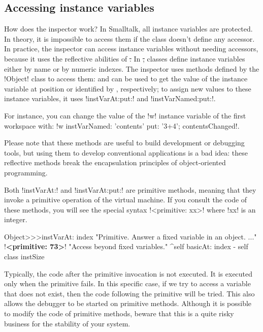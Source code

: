 \documentclass[a4paper,10pt,twoside]{book}
\begin{document}
\subsection{Accessing instance variables}

How does the inspector work?
In Smalltalk, all instance variables are protected.
In theory, it is impossible to access them if the class doesn't define any accessor.
In practice, the inspector can access instance variables without needing accessors, because it uses the reflective abilities of \st.
In \st, classes define instance variables either by name or by numeric indexes.
The inspector uses methods defined by the \ct!Object! class to access them:  and  can be used to get the value of the instance variable at position  or identified by , respectively; to assign new values to these instance variables, it uses \ct!instVarAt:put:! and \ct!instVarNamed:put:!.

For instance, you can change the value of the \ct!w! instance variable of the first workspace with: \ct!w instVarNamed: 'contents' put: '3+4'; contentsChanged!.

Please note that these methods are useful to build development or debugging tools, but using them to develop conventional applications is a bad idea: these reflective methods break the encapsulation principles of object-oriented programming.

Both \ct!instVarAt:! and \ct!instVarAt:put:! are primitive methods, meaning that they invoke a primitive operation of the \squeak virtual machine.
If you consult the code of these methods, you will see the special syntax \ct!<primitive: xx>! where \ct!xx! is an integer.

\begin{code}{}
Object>>>instVarAt: index 
	"Primitive. Answer a fixed variable in an object. ..."
	!\textbf{<primitive: 73>}!
	"Access beyond fixed variables."
	^self basicAt: index - self class instSize		
\end{code}

Typically, the code after the primitive invocation is not executed.
It is executed only when the primitive fails. In this specific case, if we try to access a variable that does not exist, then the code following the primitive will be tried.
This also allows the debugger to be started on primitive methods.
Although it is possible to modify the code of primitive methods, beware that this is a quite risky business for the stability of your \squeak system.
\end{document}
